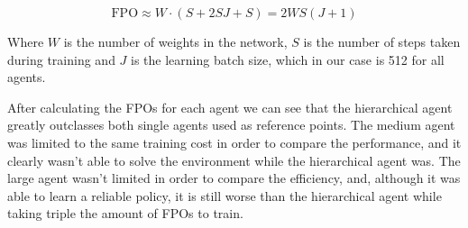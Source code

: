 \begin{equation}
    \mathrm{FPO} \approx W \cdot (S + 2SJ + S) = 2WS(J+1)
\end{equation}

Where $W$ is the number of weights in the network, $S$ is the number of steps taken during training and $J$ is the learning batch size, which in our case is 512 for all agents.

After calculating the FPOs for each agent we can see that the hierarchical agent greatly outclasses both single agents used as reference points. The medium agent was limited to the same training cost in order to compare the performance, and it clearly wasn't able to solve the environment while the hierarchical agent was. The large agent wasn't limited in order to compare the efficiency, and, although it was able to learn a reliable policy, it is still worse than the hierarchical agent while taking triple the amount of FPOs to train.